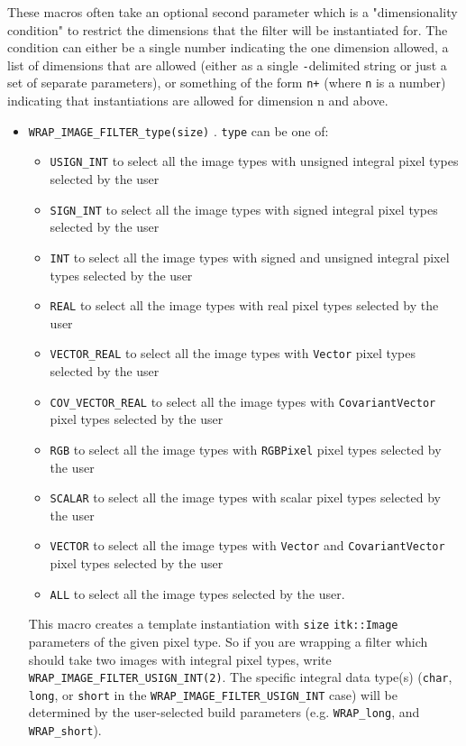 \documentclass{InsightArticle}
\begin{document}
These macros often take an optional second parameter which is a "dimensionality
condition" to restrict the dimensions that the filter will be instantiated
for. The condition can either be a single number indicating the one dimension
allowed, a list of dimensions that are allowed (either as a single \verb$-$delimited
string or just a set of separate parameters), or something of the form \verb$n+$
(where \verb$n$ is a number) indicating that instantiations are allowed for dimension
n and above.


\begin{itemize}

  \item \verb$WRAP_IMAGE_FILTER_type(size)$ . \verb$type$ can be one of:
  \begin{itemize}
    \item \verb$USIGN_INT$ to select all the image types with unsigned integral
pixel types selected by the user
    \item \verb$SIGN_INT$ to select all the image types with signed integral
pixel types selected by the user
    \item \verb$INT$ to select all the image types with signed and unsigned integral
pixel types selected by the user
    \item \verb$REAL$ to select all the image types with real pixel types selected by the user
    \item \verb$VECTOR_REAL$ to select all the image types with \verb$Vector$
pixel types selected by the user
    \item \verb$COV_VECTOR_REAL$ to select all the image types with \verb$CovariantVector$
pixel types selected by the user
    \item \verb$RGB$ to select all the image types with \verb$RGBPixel$
pixel types selected by the user
    \item \verb$SCALAR$ to select all the image types with scalar pixel types selected by the user
    \item \verb$VECTOR$ to select all the image types with \verb$Vector$ and \verb$CovariantVector$
pixel types selected by the user
    \item \verb$ALL$ to select all the image types selected by the user.
  \end{itemize}

 This macro creates a template instantiation with \verb$size$
\verb$itk::Image$ parameters of the given pixel type. So if you are wrapping a filter
which should take two images with integral pixel types, write \verb$WRAP_IMAGE_FILTER_USIGN_INT(2)$. The
specific integral data type(s) (\verb$char$, \verb$long$, or \verb$short$ in the \verb$WRAP_IMAGE_FILTER_USIGN_INT$ case) will
be determined by the user-selected build parameters (e.g. \verb$WRAP_long$, and
\verb$WRAP_short$).


\end{itemize}
\end{document}
